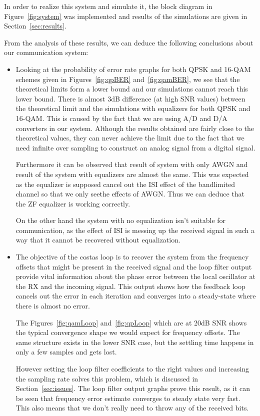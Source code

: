 \documentclass[]{article}
\begin{document}
In order to realize this system and simulate it, the block diagram in Figure~\ref{fig:system} was implemented and results of the simulations are given in Section~\ref{sec:results}.

From the analysis of these results, we can deduce the following conclusions about our communication system:
\begin{itemize}
\item Looking at the probability of error rate graphs for both QPSK and 16-QAM schemes given in Figures~\ref{fig:qpBER} and~\ref{fig:qamBER}, we see that the theoretical limits form a lower bound and our simulations cannot reach this lower bound. There is almost 3dB difference (at high SNR values) between the theoretical limit and the simulations with equalizers for both QPSK and 16-QAM. This is caused by the fact that we are using A/D and D/A converters in our system. Although the results obtained are fairly close to the theoretical values, they can never achieve the limit due to the fact that we need infinite over sampling to construct an analog signal from a digital signal. 

Furthermore it can be observed that result of system with only AWGN and result of the system with equalizers are almost the same. This was expected as the equalizer is supposed cancel out the ISI effect of the bandlimited channel so that we only seethe effects of AWGN. Thus we can deduce that the ZF equalizer is working correctly.  

On the other hand the system with no equalization isn't suitable for communication, as the effect of ISI is messing up the received signal in such a way that it cannot be recovered without equalization. 

\item The objective of the costas loop is to recover the system from the frequency offsets that might be present in the received signal and the loop filter output provide vital information about the phase error between the local oscillator at the RX and the incoming signal. This output shows how the feedback loop cancels out the error in each iteration and converges into a steady-state where there is almost no error.  

The Figures~\ref{fig:qamLoop} and~\ref{fig:qpLoop} which are at 20dB SNR shows the typical convergence shape we would expect for frequency offsets.  The same structure exists in the lower SNR case, but the settling time happens in only a few samples and gets lost.  

However setting the loop filter coefficients to the right values and increasing the sampling rate solves this problem, which is discussed in Section~\ref{sec:issues}. The loop filter output graphs prove this result, as it can be seen that frequency error estimate converges to steady state very fast. This also means that we don't really need to throw any of the received bits.


\end{itemize}
\end{document}
